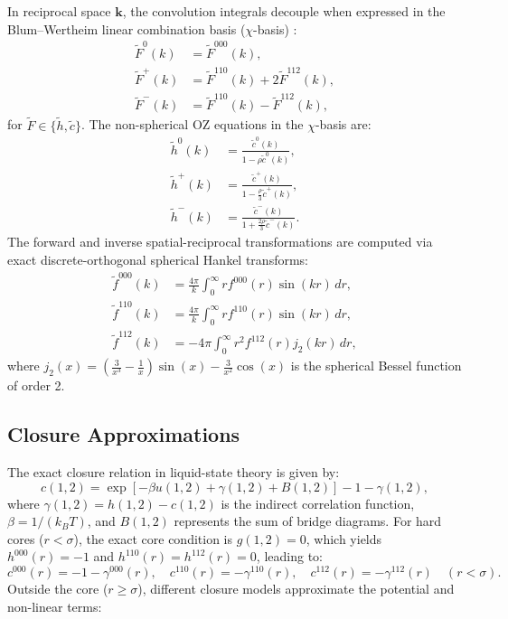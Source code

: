 \documentclass[11pt,a4paper]{article}
\begin{document}
In reciprocal space $\mathbf{k}$, the convolution integrals decouple when expressed in the Blum--Wertheim linear combination basis ($\chi$-basis) \cite{blum1972mean, blum1973mean}:
\begin{align}
    \tilde{F}^0(k) &= \tilde{F}^{000}(k), \\
    \tilde{F}^+(k) &= \tilde{F}^{110}(k) + 2\tilde{F}^{112}(k), \\
    \tilde{F}^-(k) &= \tilde{F}^{110}(k) - \tilde{F}^{112}(k),
\end{align}
for $\tilde{F} \in \{\tilde{h}, \tilde{c}\}$. The non-spherical OZ equations in the $\chi$-basis are:
\begin{align}
    \tilde{h}^0(k) &= \frac{\tilde{c}^0(k)}{1 - \rho \tilde{c}^0(k)}, \\
    \tilde{h}^+(k) &= \frac{\tilde{c}^+(k)}{1 - \frac{\rho}{3}\tilde{c}^+(k)}, \\
    \tilde{h}^-(k) &= \frac{\tilde{c}^-(k)}{1 + \frac{2\rho}{3}\tilde{c}^-(k)}.
\end{align}
The forward and inverse spatial-reciprocal transformations are computed via exact discrete-orthogonal spherical Hankel transforms:
\begin{align}
    \tilde{f}^{000}(k) &= \frac{4\pi}{k} \int_0^\infty r f^{000}(r) \sin(kr) \, dr, \\
    \tilde{f}^{110}(k) &= \frac{4\pi}{k} \int_0^\infty r f^{110}(r) \sin(kr) \, dr, \\
    \tilde{f}^{112}(k) &= -4\pi \int_0^\infty r^2 f^{112}(r) j_2(kr) \, dr,
\end{align}
where $j_2(x) = \left(\frac{3}{x^3} - \frac{1}{x}\right)\sin(x) - \frac{3}{x^2}\cos(x)$ is the spherical Bessel function of order 2.

\subsection{Closure Approximations}

The exact closure relation in liquid-state theory is given by:
\begin{equation}
    c(1, 2) = \exp\left[ -\beta u(1, 2) + \gamma(1, 2) + B(1, 2) \right] - 1 - \gamma(1, 2),
\end{equation}
where $\gamma(1, 2) = h(1, 2) - c(1, 2)$ is the indirect correlation function, $\beta = 1/(k_B T)$, and $B(1, 2)$ represents the sum of bridge diagrams. For hard cores ($r < \sigma$), the exact core condition is $g(1, 2) = 0$, which yields $h^{000}(r) = -1$ and $h^{110}(r) = h^{112}(r) = 0$, leading to:
\begin{equation}
    c^{000}(r) = -1 - \gamma^{000}(r), \quad c^{110}(r) = -\gamma^{110}(r), \quad c^{112}(r) = -\gamma^{112}(r) \quad (r < \sigma).
\end{equation}
Outside the core ($r \ge \sigma$), different closure models approximate the potential and non-linear terms:
\end{document}
